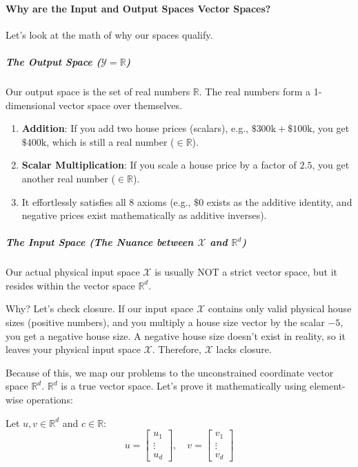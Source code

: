 \documentclass{article}
\begin{document}
\paragraph*{Why are the Input and Output Spaces Vector Spaces?}
Let's look at the math of why our spaces qualify.

\subparagraph*{The Output Space ($\mathcal{Y} = \mathbb{R}$)}
Our output space is the set of real numbers $\mathbb{R}$. The real numbers form a 1-dimensional vector space over themselves.

\begin{enumerate}
    \item \textbf{Addition}: If you add two house prices (scalars), e.g., $\$300\text{k} + \$100\text{k}$, you get $\$400\text{k}$, which is still a real number ($\in \mathbb{R}$).
    \item \textbf{Scalar Multiplication}: If you scale a house price by a factor of $2.5$, you get another real number ($\in \mathbb{R}$).
    \item It effortlessly satisfies all 8 axioms (e.g., $\$0$ exists as the additive identity, and negative prices exist mathematically as additive inverses).
\end{enumerate}

\subparagraph*{The Input Space (The Nuance between $\mathcal{X}$ and $\mathbb{R}^d$)}
Our actual physical input space $\mathcal{X}$ is usually NOT a strict vector space, but it resides within the vector space $\mathbb{R}^d$. 

Why? Let's check closure. If our input space $\mathcal{X}$ contains only valid physical house sizes (positive numbers), and you multiply a house size vector by the scalar $-5$, you get a negative house size. A negative house size doesn't exist in reality, so it leaves your physical input space $\mathcal{X}$. Therefore, $\mathcal{X}$ lacks closure.

Because of this, we map our problems to the unconstrained coordinate vector space $\mathbb{R}^d$. $\mathbb{R}^d$ is a true vector space. Let’s prove it mathematically using element-wise operations:

Let $u, v \in \mathbb{R}^d$ and $c \in \mathbb{R}$:
\[ u = \begin{bmatrix} u_1 \\ \vdots \\ u_d \end{bmatrix}, \quad v = \begin{bmatrix} v_1 \\ \vdots \\ v_d \end{bmatrix} \]
\end{document}
